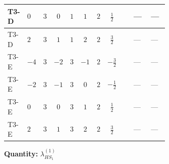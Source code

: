 \documentclass[8pt]{article}
\begin{document}
\begin{landscape}
\begin{longtable}{@{}llcccccc >{\raggedright\arraybackslash}p{0.21\linewidth} >{\raggedright\arraybackslash}p{0.21\linewidth} >{\raggedright\arraybackslash}p{0.21\linewidth}@{}}
\midrule
T3-D & $0$ & $3$ & $0$ & $1$ & $1$ & $2$ & $\frac{1}{2}$ & \scriptsize\adjustbox{max width=\linewidth}{$\begin{gathered} +8 {\lambda_{HS_1}^{(1)}} {\lambda_{S_1}^{(1)}}\end{gathered}$} & --- & --- \\
\midrule
T3-D & $2$ & $3$ & $1$ & $1$ & $2$ & $2$ & $\frac{3}{2}$ & \scriptsize\adjustbox{max width=\linewidth}{$\begin{gathered} +8 {\lambda_{HS_1}^{(1)}} {\lambda_{S_1}^{(1)}}\end{gathered}$} & --- & --- \\
\midrule
T3-E & $-4$ & $3$ & $-2$ & $3$ & $-1$ & $2$ & $-\frac{3}{2}$ & \scriptsize\adjustbox{max width=\linewidth}{$\begin{gathered} +8 {\lambda_{HS_1}^{(1)}} {\lambda_{S_1}^{(1)}}\end{gathered}$} & --- & --- \\
\midrule
T3-E & $-2$ & $3$ & $-1$ & $3$ & $0$ & $2$ & $-\frac{1}{2}$ & \scriptsize\adjustbox{max width=\linewidth}{$\begin{gathered} +8 {\lambda_{HS_1}^{(1)}} {\lambda_{S_1}^{(1)}}\end{gathered}$} & --- & --- \\
\midrule
T3-E & $0$ & $3$ & $0$ & $3$ & $1$ & $2$ & $\frac{1}{2}$ & \scriptsize\adjustbox{max width=\linewidth}{$\begin{gathered} +8 {\lambda_{HS_1}^{(1)}} {\lambda_{S_1}^{(1)}}\end{gathered}$} & --- & --- \\
\midrule
T3-E & $2$ & $3$ & $1$ & $3$ & $2$ & $2$ & $\frac{3}{2}$ & \scriptsize\adjustbox{max width=\linewidth}{$\begin{gathered} +8 {\lambda_{HS_1}^{(1)}} {\lambda_{S_1}^{(1)}}\end{gathered}$} & --- & --- \\
\midrule
\bottomrule
\end{longtable}
\clearpage
\noindent\textbf{Quantity: }$\lambda_{HS_1}^{(1)}$\par\smallskip

\end{landscape}
\end{document}

